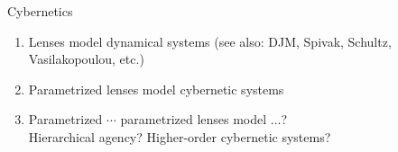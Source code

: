\begin{frame}{Cybernetics}
	\begin{enumerate}
		\item Lenses model dynamical systems (see also: DJM, Spivak, Schultz, Vasilakopoulou, etc.)
		\item Parametrized lenses model cybernetic systems
		\item Parametrized $\cdots$ parametrized lenses model {\color{coloraccent}...?}\\
		\hspace{5ex} {\color{colornote}Hierarchical agency? Higher-order cybernetic systems?}
	\end{enumerate}
\end{frame}

